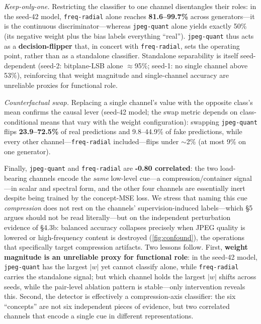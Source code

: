 

\emph{Keep-only-one.} Restricting the classifier to one channel disentangles their roles: in the seed-42 model, \texttt{freq-radial} alone reaches \textbf{81.6--99.7\%} across generators---it is the continuous discriminator---whereas \texttt{jpeg-quant} alone yields exactly 50\% (its negative weight plus the bias labels everything ``real''). \texttt{jpeg-quant} thus acts as a \textbf{decision-flipper} that, in concert with \texttt{freq-radial}, sets the operating point, rather than as a standalone classifier. Standalone separability is itself seed-dependent (seed-2: bitplane-LSB alone $\approx$95\%; seed-1: no single channel above 53\%), reinforcing that weight magnitude and single-channel accuracy are unreliable proxies for functional role.

\emph{Counterfactual swap.} Replacing a single channel's value with the opposite class's mean confirms the causal lever (seed-42 model; the swap metric depends on class-conditional means that vary with the weight configuration): swapping \texttt{jpeg-quant} flips \textbf{23.9--72.5\%} of real predictions and 9.8--44.9\% of fake predictions, while every other channel---\texttt{freq-radial} included---flips under \ensuremath{\sim}2\% (at most 9\% on one generator).

Finally, \texttt{jpeg-quant} and \texttt{freq-radial} are \textbf{-0.80 correlated}: the two load-bearing channels encode the \emph{same} low-level cue---a compression/container signal---in scalar and spectral form, and the other four channels are essentially inert despite being trained by the concept-MSE loss. We stress that naming this cue \emph{compression} does not rest on the channels' supervision-induced labels---which \S{}5 argues should not be read literally---but on the independent perturbation evidence of \S{}4.3b: balanced accuracy collapses precisely when JPEG quality is lowered or high-frequency content is destroyed (\autoref{fig:confound}), the operations that specifically target compression artifacts. Two lessons follow. First, \textbf{weight magnitude is an unreliable proxy for functional role}: in the seed-42 model, \texttt{jpeg-quant} has the largest \(|w|\) yet cannot classify alone, while \texttt{freq-radial} carries the standalone signal; but which channel holds the largest \(|w|\) shifts across seeds, while the pair-level ablation pattern is stable---only intervention reveals this. Second, the detector is effectively a compression-axis classifier: the six ``concepts'' are not six independent pieces of evidence, but two correlated channels that encode a single cue in different representations.

